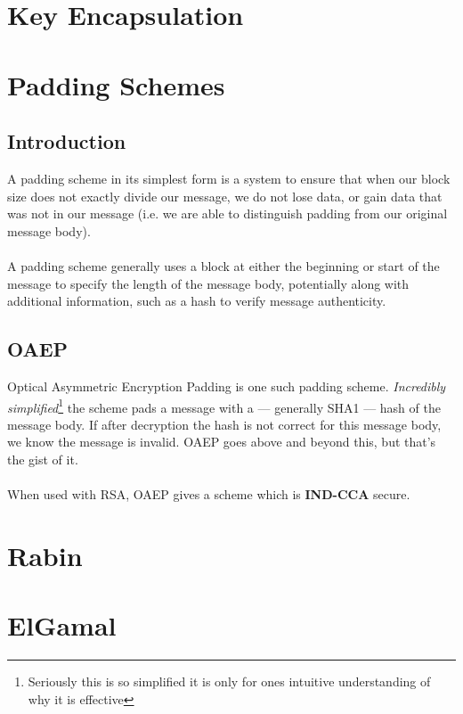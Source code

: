 \section{Key Encapsulation}

\section{Padding Schemes}

	\subsection{Introduction}
		A padding scheme in its simplest form is a system to ensure that when our block size does not exactly divide our message, we do not lose data, or gain data that was not in our message (i.e. we are able to distinguish padding from our original message body).\\
		\\
		A padding scheme generally uses a block at either the beginning or start of the message to specify the length of the message body, potentially along with additional information, such as a hash to verify message authenticity.

	\subsection{OAEP}
		Optical Asymmetric Encryption Padding is one such padding scheme. \textit{Incredibly simplified}\footnote{Seriously this is so simplified it is only for ones intuitive understanding of why it is effective} the scheme pads a message with a --- generally SHA1 --- hash of the message body. If after decryption the hash is not correct for this message body, we know the message is invalid. OAEP goes above and beyond this, but that's the gist of it.\\
		\\
		When used with RSA, OAEP gives a scheme which is \textbf{IND-CCA} secure.


\section{Rabin}

\section{ElGamal}